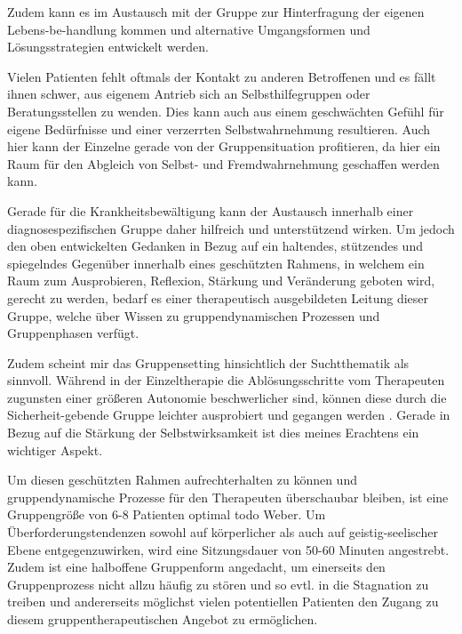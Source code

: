 Zudem kann es im Austausch mit der Gruppe zur Hinterfragung der eigenen Lebens-be-handlung kommen und alternative Umgangsformen und Lösungsstrategien entwickelt werden. 

Vielen Patienten fehlt oftmals der Kontakt zu anderen Betroffenen und es fällt ihnen schwer, aus eigenem Antrieb sich an Selbsthilfegruppen oder Beratungsstellen zu wenden. Dies kann auch aus einem geschwächten Gefühl für eigene Bedürfnisse und einer verzerrten Selbstwahrnehmung resultieren. Auch hier kann der Einzelne gerade von der Gruppensituation profitieren, da hier ein Raum für den Abgleich von Selbst- und Fremdwahrnehmung geschaffen werden kann.

Gerade für die Krankheitsbewältigung kann der Austausch innerhalb einer diagnosespezifischen Gruppe daher hilfreich und unterstützend wirken. Um jedoch den oben entwickelten Gedanken in Bezug auf ein haltendes, stützendes und spiegelndes Gegenüber innerhalb eines geschützten Rahmens, in welchem ein Raum zum Ausprobieren, Reflexion, Stärkung und Veränderung geboten wird, gerecht zu werden, bedarf es einer therapeutisch ausgebildeten Leitung dieser Gruppe, welche über Wissen zu gruppendynamischen Prozessen und Gruppenphasen verfügt. 

Zudem scheint mir das Gruppensetting hinsichtlich der Suchtthematik als sinnvoll. Während in der Einzeltherapie die Ablösungsschritte vom Therapeuten zugunsten einer größeren Autonomie beschwerlicher sind, können diese durch die Sicherheit-gebende Gruppe leichter ausprobiert und gegangen werden \autocite[vgl.]{nawe2014}. Gerade in Bezug auf die Stärkung der Selbstwirksamkeit ist dies meines Erachtens ein wichtiger Aspekt.

Um diesen geschützten Rahmen aufrechterhalten zu können und gruppendynamische Prozesse für den Therapeuten überschaubar bleiben, ist eine Gruppengröße von 6-8 Patienten optimal todo Weber. Um Überforderungstendenzen sowohl auf körperlicher als auch auf geistig-seelischer Ebene entgegenzuwirken, wird eine Sitzungsdauer von 50-60 Minuten angestrebt. Zudem ist eine halboffene Gruppenform angedacht, um einerseits den Gruppenprozess nicht allzu häufig zu stören und so evtl. in die Stagnation zu treiben und andererseits möglichst vielen potentiellen Patienten den Zugang zu diesem gruppentherapeutischen Angebot zu ermöglichen. 

